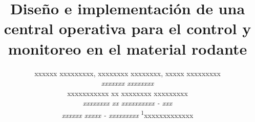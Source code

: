 \documentclass[a4paper]{IEEEtran}
\begin{document}
\title{Diseño e implementación de una central operativa para el control y monitoreo en el material rodante}


\author{

xxxxxx xxxxxxxxx, 
xxxxxxxx xxxxxxxx, 
xxxxx xxxxxxxxx \\

\normalsize \textit{xxxxxxx xxxxxxxx} \\
xxxxxxxxxxx xx xxxxxxxx xxxxxxxxx \\
\textit{xxxxxxxx xx xxxxxxxxxx - xxx} \\
\textit{xxxxxx xxxxx - xxxxxxxxx}
\textsuperscript{1}\small xxxxxxxxxxxxx \\

}


\maketitle









\end{document}
